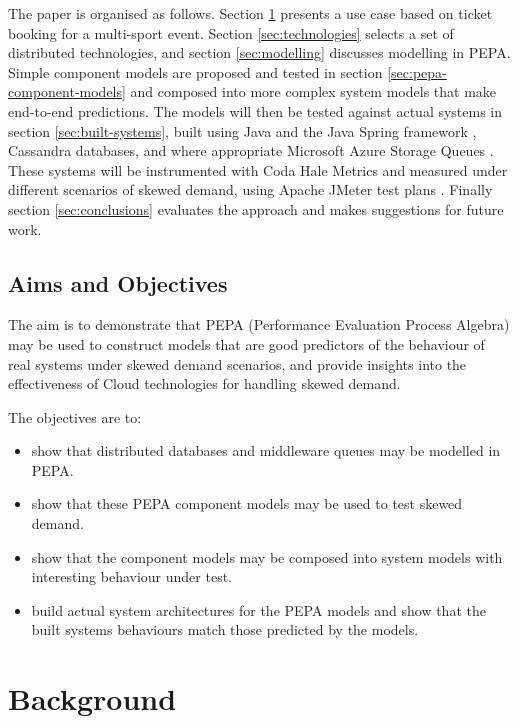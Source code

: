 \documentclass[runningheads]{llncs}
\begin{document}
The paper is organised as follows.  Section \ref{sec:background} presents a use case based on ticket booking for a multi-sport event.  Section \ref{sec:technologies} selects a set of distributed technologies, and section \ref{sec:modelling} discusses modelling in PEPA.  Simple component models are proposed and tested in section \ref{sec:pepa-component-models} and composed into more complex system models that make end-to-end predictions.
The models will then be tested against actual systems in section \ref{sec:built-systems}, built using Java and the Java Spring framework \cite{RN1076}, Cassandra \cite{RN1050}\cite{RN1075} databases, and where appropriate Microsoft Azure Storage Queues \cite{RN1072}.  These systems will be instrumented with Coda Hale Metrics \cite{RN1079} and measured under different scenarios of skewed demand, using Apache JMeter test plans \cite{RN1074}.  Finally section \ref{sec:conclusions} evaluates the approach and makes suggestions for future work.

\subsection{Aims and Objectives}

The aim is to demonstrate that PEPA (Performance Evaluation Process Algebra) \cite{RN1051} may be used to construct models that are good predictors of the behaviour of real systems under skewed demand scenarios, and provide insights into the effectiveness of Cloud technologies for handling skewed demand.

The objectives are to:
\begin{itemize}
	\item show that distributed databases and middleware queues may be modelled in PEPA.
	\item show that these PEPA component models may be used to test skewed demand.
	\item show that the component models may be composed into system models with interesting behaviour under test.
	\item build actual system architectures for the PEPA models and show that the built systems behaviours match those predicted by the models.
\end{itemize}

%
%

\section{Background}\label{sec:background}
\end{document}
